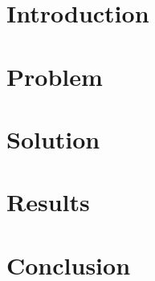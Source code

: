 
\section{Introduction}
\label{sec:introduction}


\section{Problem}
\label{sec:problem}
	


\section{Solution}
\label{sec:approach}


\section{Results}
\label{sec:results}


\section{Conclusion}
\label{sec:conclusion}
